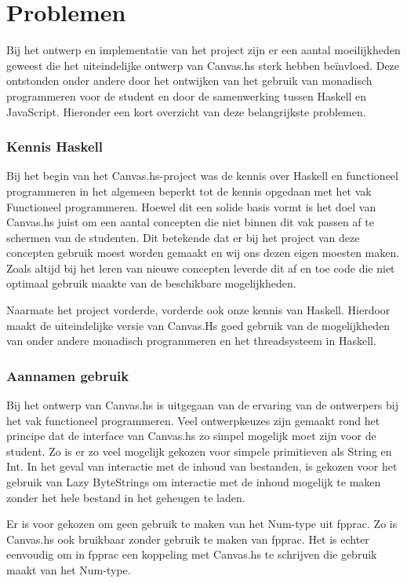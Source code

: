 \section{Problemen}

Bij het ontwerp en implementatie van het project zijn er een aantal moeilijkheden geweest die het uiteindelijke ontwerp van Canvas.hs sterk hebben beïnvloed. Deze ontstonden onder andere door het ontwijken van het gebruik van monadisch programmeren voor de student en door de samenwerking tussen Haskell en JavaScript. Hieronder een kort overzicht van deze belangrijkste problemen.

\subsubsection{Kennis Haskell}
Bij het begin van het Canvas.hs-project was de kennis over Haskell en functioneel programmeren in het algemeen beperkt tot de kennis opgedaan met het vak Functioneel programmeren. Hoewel dit een solide basis vormt is het doel van Canvas.hs juist om een aantal concepten die niet binnen dit vak passen af te schermen van de studenten. Dit betekende dat er bij het project van deze concepten gebruik moest worden gemaakt en wij ons dezen eigen moesten maken. Zoals altijd bij het leren van nieuwe concepten leverde dit af en toe code die niet optimaal gebruik maakte van de beschikbare mogelijkheden.

Naarmate het project vorderde, vorderde ook onze kennis van Haskell. Hierdoor maakt de uiteindelijke versie van Canvas.Hs goed gebruik van de mogelijkheden van onder andere monadisch programmeren en het threadsysteem in Haskell. 

\subsubsection{Aannamen gebruik}
Bij het ontwerp van Canvas.hs is uitgegaan van de ervaring van de ontwerpers bij het vak functioneel programmeren. Veel ontwerpkeuzes zijn gemaakt rond het principe dat de interface van Canvas.hs zo simpel mogelijk moet zijn voor de student. Zo is er zo veel mogelijk gekozen voor simpele primitieven als String en Int. In het geval van interactie met de inhoud van bestanden, is gekozen voor het gebruik van Lazy ByteStrings om interactie met de inhoud mogelijk te maken zonder het hele bestand in het geheugen te laden.

Er is voor gekozen om geen gebruik te maken van het Num-type uit fpprac. Zo is Canvas.hs ook bruikbaar zonder gebruik te maken van fpprac. Het is echter eenvoudig om in fpprac een koppeling met Canvas.hs te schrijven die gebruik maakt van het Num-type.

